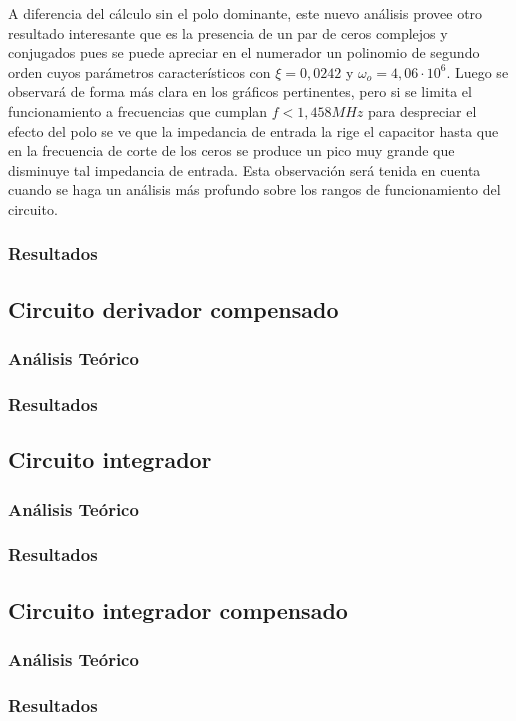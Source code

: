 A diferencia del c\'alculo sin el polo dominante, este nuevo an\'alisis provee otro resultado interesante que es la presencia de un par de ceros complejos y conjugados pues se puede apreciar en el numerador un polinomio de segundo orden cuyos par\'ametros caracter\'isticos con $\xi = 0,0242$ y $\omega_o = 4,06 \cdot 10^{6}$. Luego se observar\'a de forma m\'as clara en los gr\'aficos pertinentes, pero si se limita el funcionamiento a frecuencias que cumplan $f < 1,458MHz$ para despreciar el efecto del polo se ve que la impedancia de entrada la rige el capacitor hasta que en la frecuencia de corte de los ceros se produce un pico muy grande que disminuye tal impedancia de entrada. Esta observaci\'on ser\'a tenida en cuenta cuando se haga un an\'alisis m\'as profundo sobre los rangos de funcionamiento del circuito.

\subsubsection*{Resultados}


	\subsection*{Circuito derivador compensado}

\subsubsection*{An\'alisis Te\'orico}

\subsubsection*{Resultados}


	\subsection*{Circuito integrador}

\subsubsection*{An\'alisis Te\'orico}

\subsubsection*{Resultados}


	\subsection*{Circuito integrador compensado}

\subsubsection*{An\'alisis Te\'orico}

\subsubsection*{Resultados}


